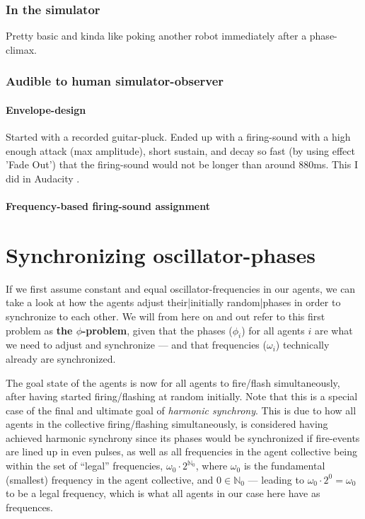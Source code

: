 	\subsubsection{In the simulator}
	Pretty basic and kinda like poking another robot immediately after a phase-climax.
	
	\subsubsection{Audible to human simulator-observer}
	\paragraph{Envelope-design}
	Started with a recorded guitar-pluck.
	Ended up with a firing-sound with a high enough attack (max amplitude), short sustain, and decay so fast (by using effect 'Fade Out') that the firing-sound would not be longer than around 880ms. This I did in Audacity .
	
	\paragraph{Frequency-based firing-sound assignment}
	
	
	
	
\section{Synchronizing oscillator-phases}
\label{sec:phase_methods}
	If we first assume constant and equal oscillator-frequencies in our agents, we can take a look at how the agents adjust their|initially random|phases in order to synchronize to each other. We will from here on and out refer to this first problem as \textbf{the $\phi$-problem}, given that the phases ($\phi_i$) for all agents $i$ are what we need to adjust and synchronize — and that frequencies ($\omega_i$) technically already are synchronized.
	
	The goal state of the agents is now for all agents to fire/flash simultaneously, after having started firing/flashing at random initially. Note that this is a special case of the final and ultimate goal of \textit{harmonic synchrony}. This is due to how all agents in the collective firing/flashing simultaneously, is considered having achieved harmonic synchrony since its phases would be synchronized if fire-events are lined up in even pulses, as well as all frequencies in the agent collective being within the set of ``legal'' frequencies, $\omega_{0} \cdot 2^{\mathbb{N}_0}$, where $\omega_0$ is the fundamental (smallest) frequency in the agent collective, and $0 \in \mathbb{N}_0$ — leading to $\omega_0 \cdot 2^0 = \omega_0$ to be a legal frequency, which is what all agents in our case here have as frequences.
	
